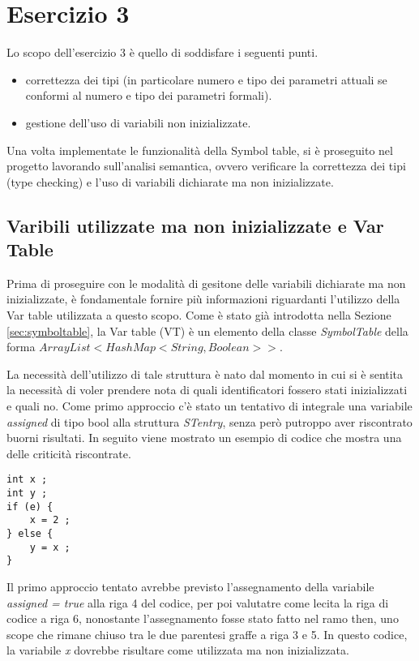 \section{Esercizio 3}
Lo scopo dell'esercizio 3 è quello di soddisfare i seguenti punti.
\begin{itemize}
    \item correttezza dei tipi (in particolare numero e tipo dei parametri attuali se conformi al numero e tipo dei parametri formali).
    \item gestione dell'uso di variabili non inizializzate.
\end{itemize}

Una volta implementate le funzionalità della Symbol table, si è proseguito nel progetto lavorando sull’analisi semantica, ovvero verificare la correttezza dei tipi (type checking)  e l’uso di variabili dichiarate ma non inizializzate.

\subsection{Varibili utilizzate ma non inizializzate e Var Table}
\label{sec:vartable}
Prima di proseguire con le modalità di gesitone delle variabili dichiarate ma non inizializzate, è fondamentale fornire più informazioni riguardanti l'utilizzo della Var table utilizzata a questo scopo. Come è stato già introdotta nella Sezione \ref{sec:symboltable}, la Var table (VT) è un elemento della classe \textit{SymbolTable} della forma \textit{$ArrayList<HashMap<String,Boolean>>$}. 

La necessità dell'utilizzo di tale struttura è nato dal momento in cui si è sentita la necessità di voler prendere nota di quali identificatori fossero stati inizializzati e quali no. Come primo approccio c'è stato un tentativo di integrale una variabile \textit{assigned} di tipo bool alla struttura \textit{STentry}, senza però putroppo aver riscontrato buorni risultati. In seguito viene mostrato un esempio di codice che mostra una delle criticità riscontrate.
\begin{verbatim}
int x ; 
int y ;
if (e) {
    x = 2 ;
} else {
    y = x ;
}
\end{verbatim}
Il primo approccio tentato avrebbe previsto l'assegnamento della variabile \textit{assigned = true} alla riga 4 del codice, per poi valutatre come lecita la riga di codice a riga 6, nonostante l'assegnamento fosse stato fatto nel ramo then, uno scope che rimane chiuso tra le due parentesi graffe a riga 3 e 5. In questo codice, la variabile \textit{x} dovrebbe risultare come utilizzata ma non inizializzata.

